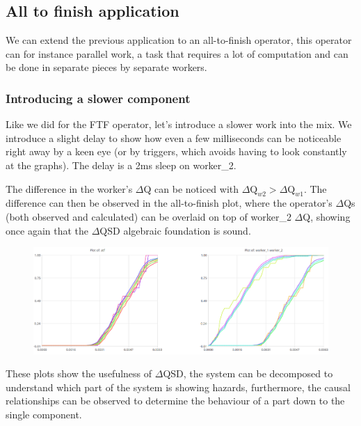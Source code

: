 \subsection{All to finish application}
    We can extend the previous application to an all-to-finish operator, this operator can for instance parallel work, a task that requires a lot of computation and can be done in separate pieces by separate workers. \cite{dq-tut}

        \subsubsection{Introducing a slower component}
            Like we did for the FTF operator, let's introduce a slower work into the mix. We introduce a slight delay to show how even a few milliseconds can be noticeable right away by a keen eye (or by triggers, which avoids having to look constantly at the graphs). The delay is a 2ms sleep on worker\_2.
 
            The difference in the worker's $\Delta$Q can be noticed with $\Delta \text{Q}_{w2} > \Delta \text{Q}_{w1}$. The difference can then be observed in the all-to-finish plot, where the operator's $\Delta$Qs (both observed and calculated) can be overlaid on top of worker\_2 $\Delta$Q, showing once again that the $\Delta$QSD algebraic foundation is sound.

            \begin{figure}[H]
                \begin{center}
                    \includegraphics[scale = 0.5]{img/overload_2/w1w2atf.png}
                \end{center}
            \end{figure}

    These plots show the usefulness of $\Delta$QSD, the system can be decomposed to understand which part of the system is showing hazards, furthermore, the causal relationships can be observed to determine the behaviour of a part down to the single component.
